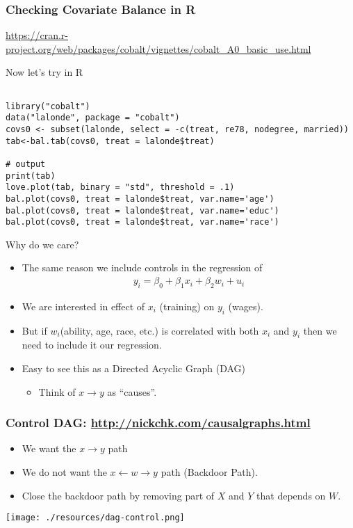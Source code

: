 \documentclass[xcolor=pdftex,dvipsnames,table,mathserif,aspectratio=169]{beamer}
\begin{document}
\begin{frame}\frametitle{Checking Covariate Balance in R}
\url{https://cran.r-project.org/web/packages/cobalt/vignettes/cobalt_A0_basic_use.html}
\end{frame}

\begin{frame}[fragile]{Now let's try in R}
  \begin{center}
    \begin{minipage}{0.8\textwidth}
      \begin{verbatim}

library("cobalt")
data("lalonde", package = "cobalt") 
covs0 <- subset(lalonde, select = -c(treat, re78, nodegree, married))
tab<-bal.tab(covs0, treat = lalonde$treat)

# output
print(tab)
love.plot(tab, binary = "std", threshold = .1)
bal.plot(covs0, treat = lalonde$treat, var.name='age')
bal.plot(covs0, treat = lalonde$treat, var.name='educ')
bal.plot(covs0, treat = lalonde$treat, var.name='race')
      \end{verbatim}
    \end{minipage}
  \end{center} 
\end{frame}

\begin{frame}{Why do we care?}
\begin{itemize}
\item The same reason we include \alert{controls} in the regression of
\begin{align*}
y_i = \beta_0 + \beta_1 x_i + \beta_2 w_i + u_i
\end{align*}
\item We are interested in effect of $x_i$ (training) on $y_i$ (wages).
\item But if $w_i$(ability, age, race, etc.) is correlated with both $x_i$ and $y_i$ then we need to include it our regression.
\item Easy to see this as a \alert{Directed Acyclic Graph} (DAG)
\begin{itemize}
\item Think of $x \rightarrow y$ as ``causes''.
\end{itemize}

\end{itemize}
\end{frame}

\begin{frame}
\frametitle{Control DAG: \url{http://nickchk.com/causalgraphs.html}}
\begin{itemize}
\item We want the $x \rightarrow y$ path
\item We do not want the $x \leftarrow w \rightarrow y$ path (\alert{Backdoor Path}).
\item Close the backdoor path by removing part of $X$ and $Y$ that depends on $W$.
\end{itemize}

\begin{center}
\texttt{[image: ./resources/dag-control.png]}
\end{center}
\end{frame}
\end{document}
